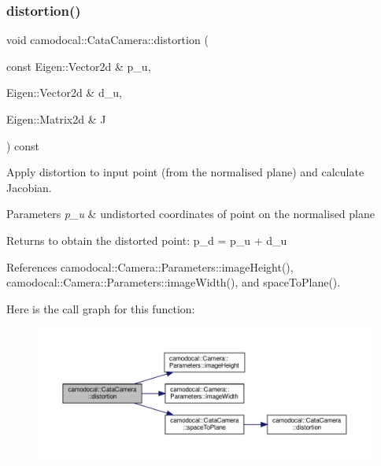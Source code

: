 \subsubsection{\texorpdfstring{distortion()}{distortion()}\hspace{0.1cm}{\footnotesize\ttfamily [2/2]}}
{\footnotesize\ttfamily void camodocal\+::\+Cata\+Camera\+::distortion (\begin{DoxyParamCaption}\item[{const Eigen\+::\+Vector2d \&}]{p\+\_\+u,  }\item[{Eigen\+::\+Vector2d \&}]{d\+\_\+u,  }\item[{Eigen\+::\+Matrix2d \&}]{J }\end{DoxyParamCaption}) const}



Apply distortion to input point (from the normalised plane) and calculate Jacobian. 


\begin{DoxyParams}{Parameters}
{\em p\+\_\+u} & undistorted coordinates of point on the normalised plane \\
\hline
\end{DoxyParams}
\begin{DoxyReturn}{Returns}
to obtain the distorted point\+: p\+\_\+d = p\+\_\+u + d\+\_\+u 
\end{DoxyReturn}


References camodocal\+::\+Camera\+::\+Parameters\+::image\+Height(), camodocal\+::\+Camera\+::\+Parameters\+::image\+Width(), and space\+To\+Plane().

Here is the call graph for this function\+:\nopagebreak
\begin{figure}[H]
\begin{center}
\leavevmode
\includegraphics[width=350pt]{classcamodocal_1_1CataCamera_af9f94a9e9109ad71fcabb0f7bc77a18f_cgraph}
\end{center}
\end{figure}
\mbox{\label{classcamodocal_1_1CataCamera_a8415dca7d06b730a0b7358745aaa4001}} 
